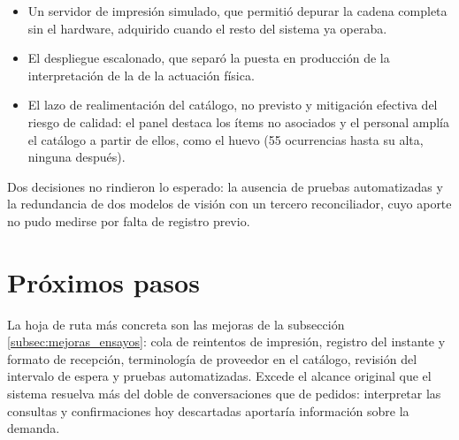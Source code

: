 \begin{itemize}
	\item Un servidor de impresión simulado, que permitió depurar la cadena completa sin el hardware, adquirido cuando el resto del sistema ya operaba.
	\item El despliegue escalonado, que separó la puesta en producción de la interpretación de la de la actuación física.
	\item El lazo de realimentación del catálogo, no previsto y mitigación efectiva del riesgo de calidad: el panel destaca los ítems no asociados y el personal amplía el catálogo a partir de ellos, como el huevo (55 ocurrencias hasta su alta, ninguna después).
\end{itemize}

Dos decisiones no rindieron lo esperado: la ausencia de pruebas automatizadas y la redundancia de dos modelos de visión con un tercero reconciliador, cuyo aporte no pudo medirse por falta de registro previo.

\section{Próximos pasos}

La hoja de ruta más concreta son las mejoras de la subsección \ref{subsec:mejoras_ensayos}: cola de reintentos de impresión, registro del instante y formato de recepción, terminología de proveedor en el catálogo, revisión del intervalo de espera y pruebas automatizadas. Excede el alcance original que el sistema resuelva más del doble de conversaciones que de pedidos: interpretar las consultas y confirmaciones hoy descartadas aportaría información sobre la demanda.